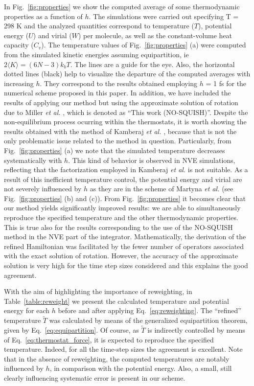 \documentclass[
journal=jctcce,
layout=twocolumn
]{achemso}
\newcommand{\timestep}{h}
\newcommand{\modified}[1]{\widetilde{#1}}
\begin{document}
In Fig.~\ref{fig:properties} we show the computed average of some thermodynamic properties as a function of $h$. The simulations were carried out specifying T = 298 K and the analyzed quantities correspond to temperature ($T$), potential energy ($U$) and virial ($W$) per molecule, as well as the constant-volume heat capacity ($C_v$).
The temperature values of Fig.~\ref{fig:properties} (a) were computed from the simulated kinetic energies assuming equipartition, ie $2 \langle K \rangle = (6N -3) k_b T$.
The lines are a guide for the eye. 
Also, the horizontal dotted lines (black) help to visualize the departure of the computed averages with increasing $\timestep$.
They correspond to the results obtained employing $h$ = 1 fs for the numerical scheme proposed in this paper.
In addition, we have included the results of applying our method but using the approximate solution of rotation due to Miller \textit{et al.} \cite{Miller_2002}, which is denoted as ``This work (NO-SQUISH)''.
Despite the non-equilibrium process ocurring within the thermostats, it is worth showing the results obtained with the method of Kamberaj \textit{et al.} \cite{Kamberaj_2005}, because that is not the only problematic issue related to the method in question.
Particularly, from Fig.~\ref{fig:properties} (a) we note that the simulated temperature decreases systematically with $\timestep$.
This kind of behavior is observed in NVE simulations\cite{Davidchack_2009,Silveira_2017}, reflecting that the factorization employed in Kamberaj \textit{et al.} \cite{Kamberaj_2005} is not suitable. 
As a result of this inefficient temperature control, the potential energy and virial are not severely influenced by $\timestep$ as they are in the scheme of Martyna \textit{et al.} \cite{Martyna_1996} (see Fig.~\ref{fig:properties} (b) and (c)).
From Fig.~\ref{fig:properties} it becomes clear that our method yields significantly improved results: we are able to simultaneously reproduce the specified temperature and the other thermodynamic properties. 
This is true also for the results corresponding to the use of the NO-SQUISH method\cite{Miller_2002} in the NVE part of the integrator.
Mathematically, the derivation of the refined Hamiltonian was facilitated by the fewer number of operators associated with the exact solution of rotation.
However, the accuracy of the approximate solution is very high for the time step sizes considered\cite{Silveira_2017} and this explains the good agreement.

With the aim of highlighting the importance of reweighting, in Table~\ref{table:reweight} we present the calculated temperature and potential energy for each $\timestep$ before and after applying Eq.~\ref{eq:reweighting}.
The ``refined'' temperature $\modified{T}$ was calculated by means of the generalized equipartition theorem, given by Eq.~\ref{eq:equipartition}.
Of course, as $\modified{T}$ is indirectly controlled by means of Eq.~\ref{eq:thermostat_force}, it is expected to reproduce the specified temperature.
Indeed, for all the time-step sizes the agreement is excellent.
Note that in the absence of reweighting, the computed temperatures are notably influenced by $h$, in comparison with the potential energy.
Also, a small, still clearly influencing systematic error is present in our scheme.
\end{document}
